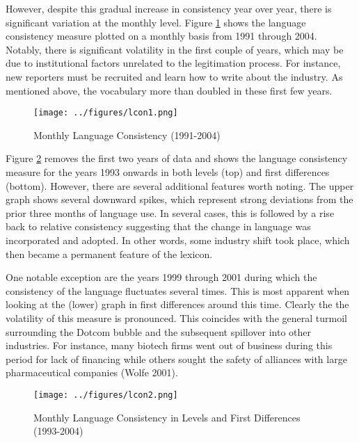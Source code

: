 However, despite this gradual increase in consistency year over year, there is significant variation at the monthly level. Figure \ref{lcon1} shows the language consistency measure plotted on a monthly basis from 1991 through 2004. Notably, there is significant volatility in the first couple of years, which may be due to institutional factors unrelated to the legitimation process. For instance, new reporters must be recruited and learn how to write about the industry. As mentioned above, the vocabulary more than doubled in these first few years. 

\begin{figure}
\begin{center}
\texttt{[image: ../figures/lcon1.png]}
\caption[Monthly Language Consistency (1991-2004)]{Monthly Language Consistency (1991-2004)\label{lcon1}}
\end{center}
\end{figure}

Figure \ref{lcon2} removes the first two years of data and shows the language consistency measure for the years 1993 onwards in both levels (top) and first differences (bottom). However, there are several additional features worth noting. The upper graph shows several downward spikes, which represent strong deviations from the prior three months of language use. In several cases, this is followed by a rise back to relative consistency suggesting that the change in language was incorporated and adopted. In other words, some industry shift took place, which then became a permanent feature of the lexicon.

One notable exception are the years 1999 through 2001 during which the consistency of the language fluctuates several times. This is most apparent when looking at the (lower) graph in first differences around this time. Clearly the the volatility of this measure is pronounced. This coincides with the general turmoil surrounding the Dotcom bubble and the subsequent spillover into other industries. For instance, many biotech firms went out of business during this period for lack of financing while others sought the safety of alliances with large pharmaceutical companies (Wolfe 2001).

\begin{figure}
\begin{center}
\texttt{[image: ../figures/lcon2.png]}
\caption[Monthly Language Consistency, Levels and Differences (1993-2004)]{Monthly Language Consistency in Levels and First Differences (1993-2004)\label{lcon2}}
\end{center}
\end{figure}

